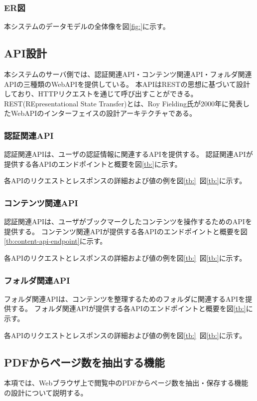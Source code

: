 \subsubsection{ER図}
本システムのデータモデルの全体像を図\ref{fig:}に示す。

\subsection{API設計}
本システムのサーバ側では、認証関連API・コンテンツ関連API・フォルダ関連APIの三種類のWebAPIを提供している。
本APIはREST\cite{rest}の思想に基づいて設計しており、HTTPリクエストを通じて呼び出すことができる。
REST(REpresentational State Transfer)とは、Roy Fielding氏が2000年に発表したWebAPIのインターフェイスの設計アーキテクチャである\cite{}。

\subsubsection{認証関連API}
認証関連APIは、ユーザの認証情報に関連するAPIを提供する。
認証関連APIが提供する各APIのエンドポイントと概要を図\ref{tb:}に示す。



各APIのリクエストとレスポンスの詳細および値の例を図\ref{tb:}~図\ref{tb:}に示す。

\subsubsection{コンテンツ関連API}
認証関連APIは、ユーザがブックマークしたコンテンツを操作するためのAPIを提供する。
コンテンツ関連APIが提供する各APIのエンドポイントと概要を図\ref{tb:content-api-endpoint}に示す。



各APIのリクエストとレスポンスの詳細および値の例を図\ref{tb:}~図\ref{tb:}に示す。

\subsubsection{フォルダ関連API}
フォルダ関連APIは、コンテンツを整理するためのフォルダに関連するAPIを提供する。
フォルダ関連APIが提供する各APIのエンドポイントと概要を図\ref{tb:}に示す。



各APIのリクエストとレスポンスの詳細および値の例を図\ref{tb:}~図\ref{tb:}に示す。

\subsection{PDFからページ数を抽出する機能}
本項では、Webブラウザ上で閲覧中のPDFからページ数を抽出・保存する機能の設計について説明する。

